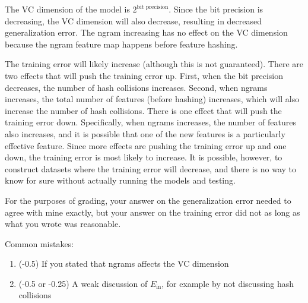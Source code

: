 \documentclass[10pt]{exam}
\theoremstyle{definition}
\newcommand{\Ein}{E_{\text{in}}}
\begin{document}
\begin{solution}
    The VC dimension of the model is $2^{\text{bit precision}}$.
    Since the bit precision is decreasing,
    the VC dimension will also decrease,
    resulting in decreased generalization error.
    The ngram increasing has no effect on the VC dimension because the ngram feature map happens before feature hashing.

    The training error will likely increase (although this is not guaranteed).
    There are two effects that will push the training error up.
    First, when the bit precision decreases, the number of hash collisions increases.
    Second, when ngrams increases, the total number of features (before hashing) increases, which will also increase the number of hash  collisions.
    There is one effect that will push the training error down.
    Specifically, when ngrams increases, the number of features also increases, and it is possible that one of the new features is a particularly effective feature.
    Since more effects are pushing the training error up and one down,
    the training error is most likely to increase.
    It is possible, however, to construct datasets where the training error will decrease, and there is no way to know for sure without actually running the models and testing.

    For the purposes of grading, your answer on the generalization error needed to agree with mine exactly, but your answer on the training error did not as long as what you wrote was reasonable.
%

    \vspace{0.2in}
    \noindent
Common mistakes:
\begin{enumerate}
    \item (-0.5) If you stated that ngrams affects the VC dimension
    \item (-0.5 or -0.25) A weak discussion of $\Ein$, for example by not discussing hash collisions
\end{enumerate}
\end{solution}
\end{document}
